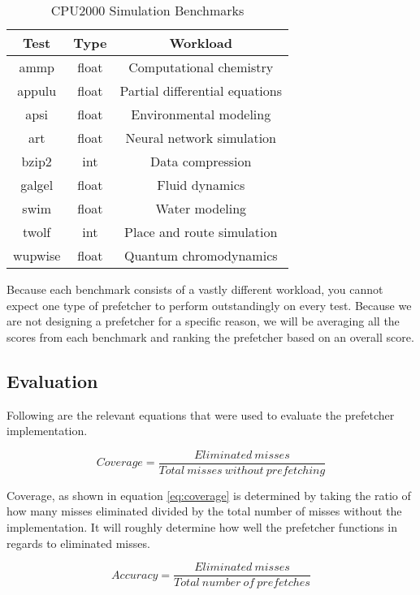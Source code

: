 \begin{table}[!htb]
    \centering
    \caption{CPU2000 Simulation Benchmarks \cite{SPEC2000}}
    
    \begin{tabular}{ c|c|c} 
    \label{tab:my_label}
    Test & Type & Workload \\ 
    \hline
    ammp & float & Computational chemistry \\ 
    appulu & float & Partial differential equations \\ 
    apsi & float & Environmental modeling \\ 
    art & float & Neural network simulation \\ 
    bzip2 & int & Data compression \\ 
    galgel & float & Fluid dynamics \\ 
    swim & float & Water modeling \\ 
    twolf & int & Place and route simulation \\ 
    wupwise & float & Quantum chromodynamics \\ 
    \end{tabular}
\end{table}

Because each benchmark consists of a vastly different workload, you cannot expect one type of prefetcher to perform outstandingly on every test. Because we are not designing a prefetcher for a specific reason, we will be averaging all the scores from each benchmark and ranking the prefetcher based on an overall score.

\subsection{Evaluation}
    Following are the relevant equations that were used to evaluate the prefetcher implementation. 
    
    \begin{equation}
        Coverage = \frac{Eliminated\ misses}{Total\ misses\ without\ prefetching}
        \label{eq:coverage}
    \end{equation}
    
    Coverage, as shown in equation \ref{eq:coverage} is determined by taking the ratio of how many misses eliminated divided by the total number of misses without the implementation. It will roughly determine how well the prefetcher functions in regards to eliminated misses.
    
    \begin{equation}
        Accuracy = \frac{Eliminated\ misses}{Total\ number\ of\ prefetches}
        \label{eq:accuracy}
    \end{equation}
    
